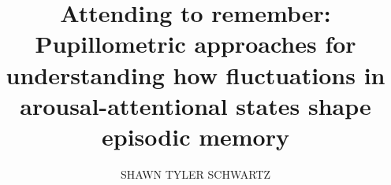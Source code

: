 \title{Attending to remember: \\Pupillometric approaches for understanding how fluctuations in arousal-attentional states shape episodic memory}
\author{SHAWN TYLER SCHWARTZ}
